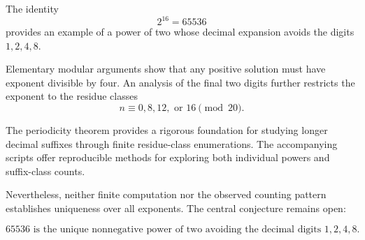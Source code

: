 \documentclass[11pt,a4paper]{article}
\theoremstyle{definition}
\theoremstyle{plain}
\theoremstyle{remark}
\begin{document}
The identity
\[
2^{16}=65536
\]
provides an example of a power of two whose decimal expansion
avoids the digits \(1,2,4,8\).

Elementary modular arguments show that any positive solution
must have exponent divisible by four. An analysis of the final
two digits further restricts the exponent to the residue classes
\[
n\equiv0,8,12,\text{ or }16\pmod{20}.
\]

The periodicity theorem provides a rigorous foundation for
studying longer decimal suffixes through finite residue-class
enumerations. The accompanying scripts offer reproducible
methods for exploring both individual powers and suffix-class
counts.

Nevertheless, neither finite computation nor the observed
counting pattern establishes uniqueness over all exponents.
The central conjecture remains open:

\[
\boxed{
\text{\(65536\) is the unique nonnegative power of two
avoiding the decimal digits \(1,2,4,8\).}
}
\]
\end{document}
